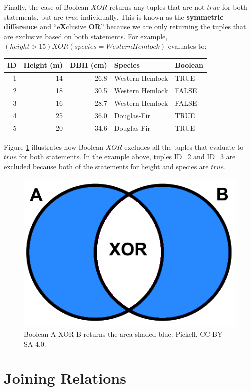 \documentclass[
]{book}
\begin{document}
Finally, the case of Boolean \(XOR\) returns any tuples that are not \(true\) for both statements, but are \(true\) individually. This is known as the \textbf{symmetric difference} and ``e\textbf{X}clusive \textbf{OR}'' because we are only returning the tuples that are exclusive based on both statements. For example, \((height>15)XOR(species=WesternHemlock)\) evaluates to:

\begin{tabular}{rrrll}
\toprule
ID & Height (m) & DBH (cm) & Species & Boolean\\
\midrule
1 & 14 & 26.8 & Western Hemlock & TRUE\\
2 & 18 & 30.5 & Western Hemlock & FALSE\\
3 & 16 & 28.7 & Western Hemlock & FALSE\\
4 & 25 & 36.0 & Douglas-Fir & TRUE\\
5 & 20 & 34.6 & Douglas-Fir & TRUE\\
\bottomrule
\end{tabular}

Figure \ref{fig:5-boolean-xor} illustrates how Boolean \(XOR\) excludes all the tuples that evaluate to \(true\) for both statements. In the example above, tuples ID=2 and ID=3 are excluded because both of the statements for height and species are \(true\).

\begin{figure}
\includegraphics[width=0.75\linewidth]{images/05-boolean-xor} \caption{Boolean A XOR B returns the area shaded blue. Pickell, CC-BY-SA-4.0.}\label{fig:5-boolean-xor}
\end{figure}

\hypertarget{joining-relations}{%
\section{Joining Relations}\label{joining-relations}}
\end{document}
